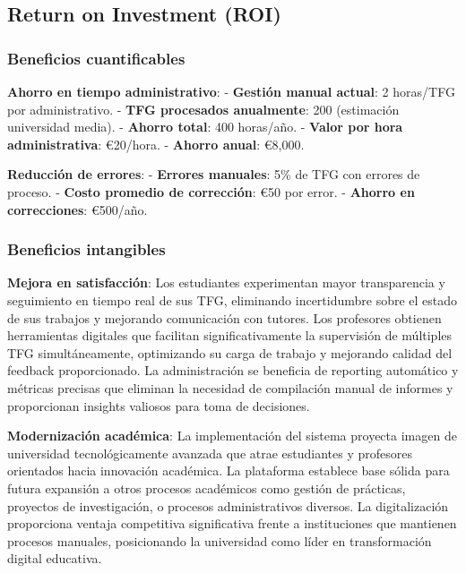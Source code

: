 \documentclass[12pt,a4paper,oneside]{report}
\begin{document}
\subsection{Return on Investment (ROI)}\label{return-on-investment-roi}

\subsubsection{Beneficios
cuantificables}\label{beneficios-cuantificables}

\textbf{Ahorro en tiempo administrativo}: - \textbf{Gestión manual
actual}: 2 horas/TFG por administrativo. - \textbf{TFG procesados
anualmente}: 200 (estimación universidad media). - \textbf{Ahorro
total}: 400 horas/año. - \textbf{Valor por hora administrativa}:
€20/hora. - \textbf{Ahorro anual}: €8,000.

\textbf{Reducción de errores}: - \textbf{Errores manuales}: 5\% de TFG
con errores de proceso. - \textbf{Costo promedio de corrección}: €50 por
error. - \textbf{Ahorro en correcciones}: €500/año.

\subsubsection{Beneficios intangibles}\label{beneficios-intangibles}

\textbf{Mejora en satisfacción}: Los estudiantes experimentan mayor transparencia y seguimiento en tiempo real de sus TFG, eliminando incertidumbre sobre el estado de sus trabajos y mejorando comunicación con tutores. Los profesores obtienen herramientas digitales que facilitan significativamente la supervisión de múltiples TFG simultáneamente, optimizando su carga de trabajo y mejorando calidad del feedback proporcionado. La administración se beneficia de reporting automático y métricas precisas que eliminan la necesidad de compilación manual de informes y proporcionan insights valiosos para toma de decisiones.

\textbf{Modernización académica}: La implementación del sistema proyecta imagen de universidad tecnológicamente avanzada que atrae estudiantes y profesores orientados hacia innovación académica. La plataforma establece base sólida para futura expansión a otros procesos académicos como gestión de prácticas, proyectos de investigación, o procesos administrativos diversos. La digitalización proporciona ventaja competitiva significativa frente a instituciones que mantienen procesos manuales, posicionando la universidad como líder en transformación digital educativa.
\end{document}
